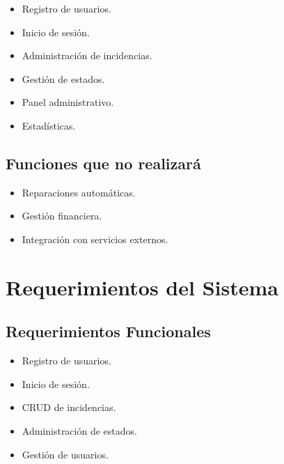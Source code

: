 \documentclass[12pt,letterpaper,oneside]{extreport}
\begin{document}
\begin{itemize}
    \item Registro de usuarios.
    
    \item Inicio de sesión.
    
    \item Administración de incidencias.
    
    \item Gestión de estados.
    
    \item Panel administrativo.
    
    \item Estadísticas.
\end{itemize}

\section{Funciones que no realizará}

\begin{itemize}
    \item Reparaciones automáticas.
    
    \item Gestión financiera.
    
    \item Integración con servicios externos.
\end{itemize}

\chapter{Requerimientos del Sistema}

\section{Requerimientos Funcionales}

\begin{itemize}
    \item Registro de usuarios.
    
    \item Inicio de sesión.
    
    \item CRUD de incidencias.
    
    \item Administración de estados.
    
    \item Gestión de usuarios.
\end{itemize}
\end{document}
